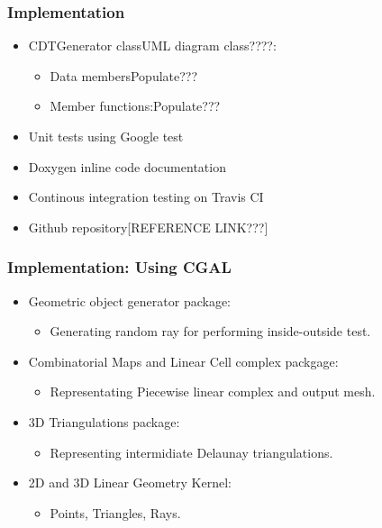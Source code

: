 \documentclass{beamer}
\begin{document}
	\begin{frame}
		\frametitle{Implementation}
			\begin{itemize}
				\item CDTGenerator class{UML diagram class????}:
					\begin{itemize}
						\item Data members{Populate???}
						\item Member functions:{Populate???}	
					\end{itemize}		
				\item Unit tests using Google test
				\item Doxygen inline code documentation
				\item Continous integration testing on Travis CI	
				\item Github repository[REFERENCE LINK???]	
			\end{itemize}
	\end{frame}	
	\begin{frame}
		\frametitle{Implementation: Using CGAL}
			\begin{itemize}
				\item Geometric object generator package:
					\begin{itemize}
						\item Generating random ray for performing inside-outside test.	
					\end{itemize}
				\item Combinatorial Maps and Linear Cell complex packgage:
					\begin{itemize}
						\item Representating Piecewise linear complex and output mesh.	
					\end{itemize}
				\item 3D Triangulations package:
					\begin{itemize}
						\item Representing intermidiate Delaunay triangulations.	
					\end{itemize}		
				\item 2D and 3D Linear Geometry Kernel:
					\begin{itemize}
						\item Points, Triangles, Rays.	
					\end{itemize}		
			\end{itemize}		
	\end{frame}	
\end{document}
